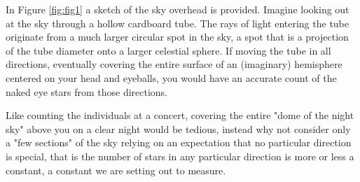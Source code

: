 \documentclass{article}
\begin{document}
In Figure \ref{fig:fig1} a sketch of the sky overhead is provided. Imagine looking out at the sky through a hollow cardboard tube. The rays of light entering the tube originate from a much larger circular spot in the sky, a spot that is a projection of the tube diameter onto a larger celestial sphere.  If moving the tube in all directions, eventually covering the entire surface of an (imaginary) hemisphere centered on your head and eyeballs, you would have an accurate count of the naked eye stars from those directions. 

Like counting the individuals at a concert, covering the entire "dome of the night sky" above you on a clear night would be tedious, instead why not consider only a "few sections" of the sky relying on an expectation that no particular direction is special, that is the number of stars in any particular direction is more or less a constant, a constant we are setting out to measure.
\end{document}
